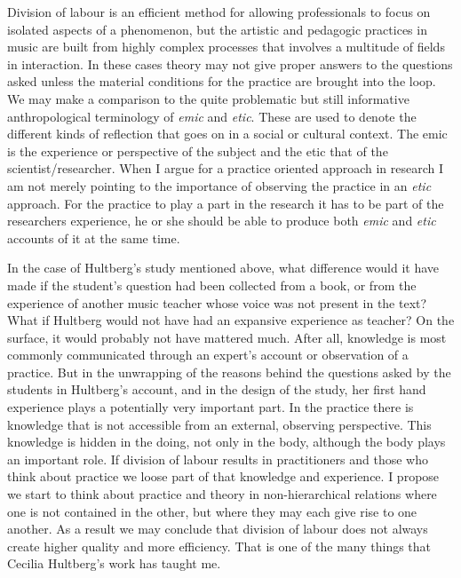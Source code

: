 \documentclass[12pt]{article}
\begin{document}
Division of labour is an efficient method for allowing professionals to focus on isolated aspects of a phenomenon, but the artistic and pedagogic practices in music are built from highly complex processes that involves a multitude of fields in interaction. In these cases theory may not give proper answers to the questions asked unless the material conditions for the practice are brought into the loop. We may make a comparison to the quite problematic but still informative anthropological terminology of \emph{emic} and \emph{etic}. These are used to denote the different kinds of reflection that goes on in a social or cultural context. The emic is the experience or perspective of the subject and the etic that of the scientist/researcher. When I argue for a practice oriented approach in research I am not merely pointing to the importance of observing the practice in an \emph{etic} approach. For the practice to play a part in the research it has to be part of the researchers experience, he or she should be able to produce both \emph{emic} and \emph{etic} accounts of it at the same time.

In the case of Hultberg's study mentioned above, what difference would it have made if the student's question had been collected from a book, or from the experience of another music teacher whose voice was not present in the text? What if Hultberg would not have had an expansive experience as teacher? On the surface, it would probably not have mattered much. After all, knowledge is most commonly communicated through an expert's account or observation of a practice. But in the unwrapping of the reasons behind the questions asked by the students in Hultberg's account, and in the design of the study, her first hand experience plays a potentially very important part. In the practice there is knowledge that is not accessible from an external, observing perspective. This knowledge is hidden in the doing, not only in the body, although the body plays an important role. If division of labour results in practitioners and those who think about practice we loose part of that knowledge and experience. I propose we start to think about practice and theory in non-hierarchical relations where one is not contained in the other, but where they may each give rise to one another. As a result we may conclude that division of labour does not always create higher quality and more efficiency. That is one of the many things that Cecilia Hultberg's work has taught me.

\printbibliography
\end{document}

